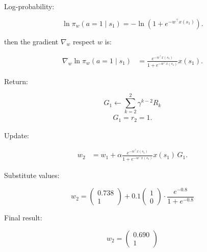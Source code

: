 \documentclass[main.tex]{subfiles}
\begin{document}
	Log-probability:
	
	\begin{equation}
		\ln \pi_w(a=1 \mid s_1)
		= - \ln\left( 1 + e^{-w^\top x(s_1)} \right).
	\end{equation}
	
	then the gradient $\nabla_w$ respect $w$ is:
	
	\begin{align}
		\nabla_w \ln \pi_w(a=1 \mid s_1)
		&= \frac{e^{-w^\top x(s_1)}}{1 + e^{-w^\top x(s_1)}} x(s_1).
	\end{align}
	
	Return:
	
	\begin{equation}
		G_1 \leftarrow \sum_{k=2}^{2}\gamma^{k-2}R_{k}
	\end{equation}
	\begin{align}
		G_1 = r_2 = 1.
	\end{align}
	
	Update:
	
	\begin{align}
		w_2 
		&= 
		w_1 + \alpha \frac{e^{-w^\top x(s_1)}}{1 + e^{-w^\top x(s_1)}} x(s_1) \, G_1.
	\end{align}
	
	Substitute values:
	
	\begin{equation}
		w_2 =
		\begin{pmatrix}
			0.738\\
			1
		\end{pmatrix}
		+ 0.1 
		\begin{pmatrix}
			1\\
			0
		\end{pmatrix}
		\cdot
		\frac{e^{-0.8}}{1 + e^{-0.8}}
	\end{equation}
	
	Final result:
	
	\begin{equation}
		\boxed{
			w_2 = 
			\begin{pmatrix}
				0.690 \\
				1
			\end{pmatrix}
		}
	\end{equation}
	
\end{document}
